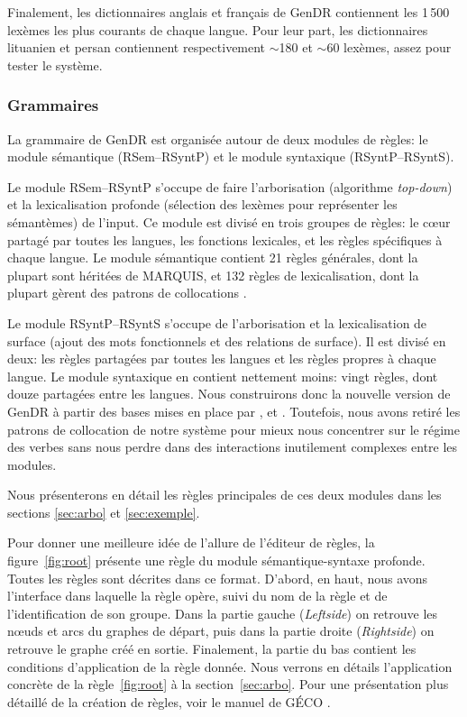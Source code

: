 Finalement, les dictionnaires anglais et français de GenDR contiennent les 1\,500 lexèmes les plus courants de chaque langue. Pour leur part, les dictionnaires lituanien \citep{dubinskaite17} et persan contiennent respectivement $\sim$180 et $\sim$60 lexèmes, assez pour tester le système.


\subsubsection{Grammaires}
La grammaire de GenDR est organisée autour de deux modules de règles: le module sémantique (\ac{RSem}--\ac{RSyntP}) et le module syntaxique (\ac{RSyntP}--\ac{RSyntS}).

Le module \ac{RSem}--\ac{RSyntP} s'occupe de faire l'arborisation (algorithme \emph{top-down}) et la lexicalisation profonde (sélection des lexèmes pour représenter les sémantèmes) de l'input. Ce module est divisé en trois groupes de règles: le c\oe{}ur partagé par toutes les langues, les fonctions lexicales, et les règles spécifiques à chaque langue. Le module sémantique contient 21 règles générales, dont la plupart sont héritées de MARQUIS, et 132 règles de lexicalisation, dont la plupart gèrent des patrons de collocations \citep{LambreyImplementationcollocationspour2017}.

Le module \ac{RSyntP}--\ac{RSyntS} s'occupe de l'arborisation et la lexicalisation de surface (ajout des mots fonctionnels et des relations de surface). Il est divisé en deux: les règles partagées par toutes les langues et les règles propres à chaque langue. Le module syntaxique en contient nettement moins: vingt règles, dont douze partagées entre les langues. Nous construirons donc la nouvelle version de GenDR à partir des bases mises en place par \cite{LambreyImplementationcollocationspour2017}, \cite{dubinskaite17} et \cite{lareau18}. Toutefois, nous avons retiré les patrons de collocation de notre système pour mieux nous concentrer sur le régime des verbes sans nous perdre dans des interactions inutilement complexes entre les modules.

Nous présenterons en détail les règles principales de ces deux modules dans les sections \ref{sec:arbo} et \ref{sec:exemple}. 

Pour donner une meilleure idée de l'allure de l'éditeur de règles, la figure~\ref{fig:root} présente une règle du module sémantique-syntaxe profonde. Toutes les règles sont décrites dans ce format. D'abord, en haut, nous avons l'interface dans laquelle la règle opère, suivi du nom de la règle et de l'identification de son groupe. Dans la partie gauche (\emph{Leftside}) on retrouve les n\oe{}uds et arcs du graphes de départ, puis dans la partie droite (\emph{Rightside}) on retrouve le graphe créé en sortie. Finalement, la partie du bas contient les conditions d'application de la règle donnée. Nous verrons en détails l'application concrète de la règle~\ref{fig:root} à la section~\ref{sec:arbo}. Pour une présentation plus détaillé de la création de règles, voir le manuel de GÉCO \citep{LambreyGECOv1User2016}.

